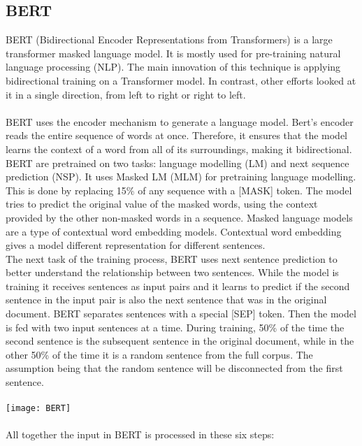 \subsection{BERT}
BERT (Bidirectional Encoder Representations from Transformers) is a large transformer masked language model. It is mostly used for pre-training natural language processing (NLP). The main innovation of this technique is applying bidirectional training on a Transformer model. In contrast, other efforts looked at it in a single direction, from left to right or right to left.\\\\
BERT uses the encoder mechanism to generate a language model. Bert's encoder reads the entire sequence of words at once.  Therefore, it ensures that the model learns the context of a word from all of its surroundings, making it bidirectional. BERT are pretrained on two tasks: language modelling (LM) and next sequence prediction (NSP). It uses Masked LM (MLM) for pretraining language modelling. This is done by replacing 15\% of any sequence with a [MASK] token. The model tries to predict the original value of the masked words, using the context provided by the other non-masked words in a sequence. Masked language models are a type of contextual word embedding models. Contextual word embedding gives a model different representation for different sentences. 
\pagebreak
\\The next task of the training process, BERT uses next sentence prediction to better understand the relationship between two sentences. While the model is training it receives sentences as input pairs and it learns to predict if the second sentence in the input pair is also the next sentence that was in the original document. BERT separates sentences with a special [SEP] token. Then the model is fed with two input sentences at a time. During training, 50\% of the time the second sentence is the subsequent sentence in the original document, while in the other 50\% of the time it is a random sentence from the full corpus. The assumption being that the random sentence will be disconnected from the first sentence.\\\\
\texttt{[image: BERT]}\\\\
All together the input in BERT is processed in these six steps: 
